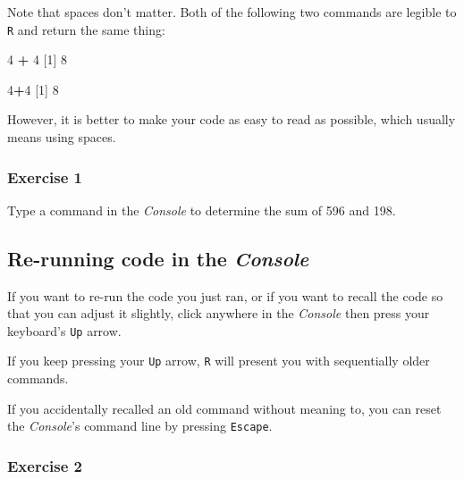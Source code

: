 \documentclass[
]{book}
\newenvironment{Shaded}{\begin{snugshade}}{\end{snugshade}}
\newcommand{\DecValTok}[1]{\textcolor[rgb]{0.00,0.00,0.81}{#1}}
\newcommand{\NormalTok}[1]{#1}
\newcommand{\OperatorTok}[1]{\textcolor[rgb]{0.81,0.36,0.00}{\textbf{#1}}}
\newcommand{\StringTok}[1]{\textcolor[rgb]{0.31,0.60,0.02}{#1}}
\begin{document}
Note that spaces don't matter. Both of the following two commands are legible to \texttt{R} and return the same thing:

\begin{Shaded}
\begin{Highlighting}[]
\DecValTok{4} \OperatorTok{+}\StringTok{ }\DecValTok{4}
\NormalTok{[}\DecValTok{1}\NormalTok{] }\DecValTok{8}

\DecValTok{4}\OperatorTok{+}\DecValTok{4}
\NormalTok{[}\DecValTok{1}\NormalTok{] }\DecValTok{8}
\end{Highlighting}
\end{Shaded}

However, it is better to make your code as easy to read as possible, which usually means using spaces.

\hypertarget{exercise-1}{%
\subsubsection*{Exercise 1}\label{exercise-1}}

Type a command in the \emph{Console} to determine the sum of 596 and 198.

\hypertarget{re-running-code-in-the-console}{%
\subsection*{\texorpdfstring{Re-running code in the \emph{Console}}{Re-running code in the Console}}\label{re-running-code-in-the-console}}

If you want to re-run the code you just ran, or if you want to recall the code so that you can adjust it slightly, click anywhere in the \emph{Console} then press your keyboard's \texttt{Up} arrow.

If you keep pressing your \texttt{Up} arrow, \texttt{R} will present you with sequentially older commands.

If you accidentally recalled an old command without meaning to, you can reset the \emph{Console}'s command line by pressing \texttt{Escape}.

\hypertarget{exercise-2}{%
\subsubsection*{Exercise 2}\label{exercise-2}}
\end{document}
